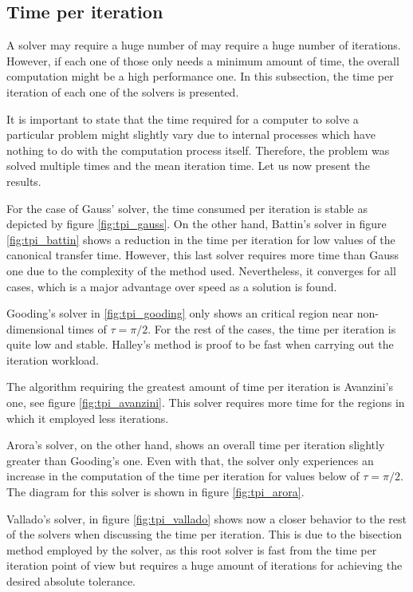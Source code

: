 \subsection{Time per iteration}

A solver may require a huge number of may require a huge number of iterations.
However, if each one of those only needs a minimum amount of time, the overall
computation might be a high performance one. In this subsection, the time per
iteration of each one of the solvers is presented.

It is important to state that the time required for a computer to solve a
particular problem might slightly vary due to internal processes which have
nothing to do with the computation process itself. Therefore, the problem was
solved multiple times and the mean iteration time. Let us now present the
results.

For the case of Gauss' solver, the time consumed per iteration is stable as
depicted by figure \ref{fig:tpi_gauss}. On the other hand, Battin's solver in
figure \ref{fig:tpi_battin} shows a reduction in the time per iteration for low
values of the canonical transfer time. However, this last solver requires more
time than Gauss one due to the complexity of the method used. Nevertheless, it
converges for all cases, which is a major advantage over speed as a solution is
found.

Gooding's solver in \ref{fig:tpi_gooding} only shows an critical region near
non-dimensional times of $\tau=\pi/2$. For the rest of the cases, the time per
iteration is quite low and stable. Halley's method is proof to be fast when
carrying out the iteration workload.

The algorithm requiring the greatest amount of time per iteration is Avanzini's
one, see figure \ref{fig:tpi_avanzini}. This solver requires more time for the
regions in which it employed less iterations.

Arora's solver, on the other hand, shows an overall time per iteration slightly
greater than Gooding's one. Even with that, the solver only experiences an
increase in the computation of the time per iteration for values below of
$\tau=\pi/2$. The diagram for this solver is shown in figure
\ref{fig:tpi_arora}.

Vallado's solver, in figure \ref{fig:tpi_vallado} shows now a closer behavior
to the rest of the solvers when discussing the time per iteration. This is due
to the bisection method employed by the solver, as this root solver is fast from
the time per iteration point of view but requires a huge amount of iterations
for achieving the desired absolute tolerance.

